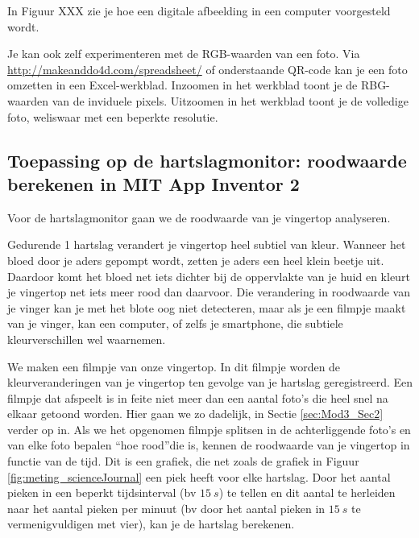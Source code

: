 In Figuur XXX zie je hoe een digitale afbeelding in een computer voorgesteld wordt.


Je kan ook zelf experimenteren met de RGB-waarden van een foto. Via \url{http://makeanddo4d.com/spreadsheet/} of onderstaande QR-code kan je een foto omzetten in een Excel-werkblad. Inzoomen in het werkblad toont je de RBG-waarden van de inviduele pixels. Uitzoomen in het werkblad toont je de volledige foto, weliswaar met een beperkte resolutie.




\subsection{Toepassing op de hartslagmonitor: roodwaarde berekenen in MIT App Inventor 2}

Voor de hartslagmonitor gaan we de roodwaarde van je vingertop analyseren. 

Gedurende 1 hartslag verandert je vingertop heel subtiel van kleur. 
Wanneer het bloed door je aders gepompt wordt, zetten je aders een heel klein beetje uit. Daardoor komt het bloed net iets dichter bij de oppervlakte van je huid en kleurt je vingertop net iets meer rood dan daarvoor.
Die verandering in roodwaarde van je vinger kan je met het blote oog niet detecteren, maar als je een filmpje maakt van je vinger, kan een computer, of zelfs je smartphone, die subtiele kleurverschillen wel waarnemen.

We maken een filmpje van onze vingertop. In dit filmpje worden de kleurveranderingen van je vingertop ten gevolge van je hartslag geregistreerd. Een filmpje dat afspeelt is in feite niet meer dan een aantal foto's die heel snel na elkaar getoond worden. Hier gaan we zo dadelijk, in Sectie \ref{sec:Mod3_Sec2} verder op in. Als we het opgenomen filmpje splitsen in de achterliggende foto's en van elke foto bepalen \textquotedblleft hoe rood\textquotedblright die is, kennen de roodwaarde van je vingertop in functie van de tijd. Dit is een grafiek, die net zoals de grafiek in Figuur \ref{fig:meting_scienceJournal} een piek heeft voor elke hartslag. Door het aantal pieken in een beperkt tijdsinterval (bv $15~s$) te tellen en dit aantal te herleiden naar het aantal pieken per minuut (bv door het aantal pieken in $15~s$ te vermenigvuldigen met vier), kan je de hartslag berekenen.

